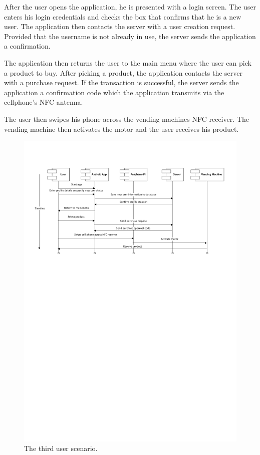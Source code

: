 After the user opens the application, he is presented with a login screen. The
user enters his login credentials and checks the box that confirms that he is a
new user. The application then contacts the server with a user creation
request. Provided that the username is not already in use, the server sends the
application a confirmation.

The application then returns the user to the main menu where the user can pick
a product to buy. After picking a product, the application contacts the server
with a purchase request. If the transaction is successful, the server sends the
application a confirmation code which the application transmits via the
cellphone's NFC antenna.

The user then swipes his phone across the vending machines NFC receiver. The
vending machine then activates the motor and the user receives his product. 

\begin{figure}
 \centering 
 \includegraphics[clip=true, trim = 0 500 0 50,
 scale=0.7]{user_story_3}
 \caption{The third user scenario.}
 \label{fig:test3}
\end{figure}